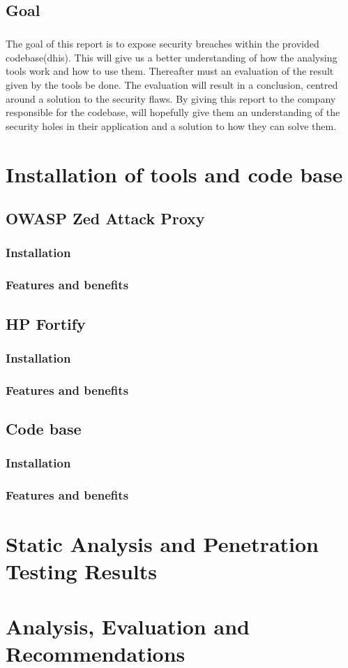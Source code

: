 \documentclass[11pt,english,a4paper]{report}
\begin{document}
\section{Goal}
\paragraph{}
The goal of this report is to expose security breaches within the provided codebase(\gls{dhis}). This will give us a better understanding of how the analysing tools work and how to use them. Thereafter must an evaluation of the result given by the tools be done. The evaluation will result in a conclusion, centred around a solution to the security flaws. By giving this report to the company responsible for the codebase, will hopefully give them an understanding of the security holes in their application and a solution to how they can solve them.

\chapter{Installation of tools and code base}
\section{OWASP Zed Attack Proxy}
\subsection{Installation}
\subsection{Features and benefits}
\section{HP Fortify}
\subsection{Installation}
\subsection{Features and benefits}
\section{Code base}
\subsection{Installation}
\subsection{Features and benefits}



\chapter{Static Analysis and Penetration Testing Results}
\chapter{Analysis, Evaluation and Recommendations}
\end{document}

